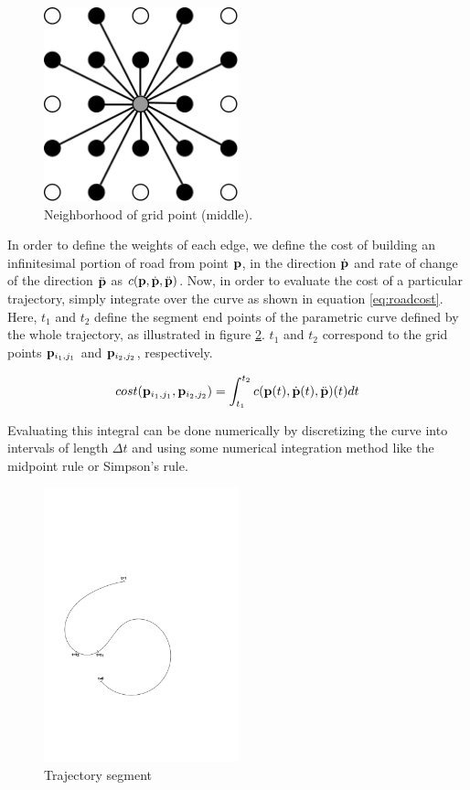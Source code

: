 \begin{figure}[ht]
\centering
\includegraphics[width=0.5\textwidth]{figure/neighbormask}
\caption{Neighborhood of grid point (middle).}
\label{fig:neighbormask}
\end{figure}

In order to define the weights of each edge, we define the cost of building an infinitesimal portion of road from point ${\mathbf p}$, in the direction $\dot{\mathbf p}$ and rate of change of the direction $\ddot{\mathbf p}$ as $c({\mathbf p}, \dot{{\mathbf p}}, \ddot{{\mathbf p}})$. Now, in order to evaluate the cost of a particular trajectory, simply integrate over the curve as shown in equation \ref{eq:roadcost}. Here, $t_1$ and $t_2$ define the segment end points of the parametric curve defined by the whole trajectory, as illustrated in figure \ref{fig:trajectory_segment}. $t_1$ and $t_2$ correspond to the grid points ${\mathbf p}_{i_1,j_1}$ and ${\mathbf p}_{i_2,j_2}$, respectively.

\begin{equation}
cost({\mathbf p}_{i_1,j_1}, {\mathbf p}_{i_2,j_2}) = \int_{t_1}^{t_2} c({\mathbf p}(t), \dot{{\mathbf p}}(t), \ddot{{\mathbf p}})(t) dt
\label{eq:roadcost}
\end{equation}

Evaluating this integral can be done numerically by discretizing the curve into intervals of length $\Delta t$ and using some numerical integration method like the midpoint rule or Simpson's rule.

\begin{figure}[ht]
\centering
\includegraphics[width=0.5\textwidth]{figure/trajectory_segment}
\caption{Trajectory segment}
\label{fig:trajectory_segment}
\end{figure}

